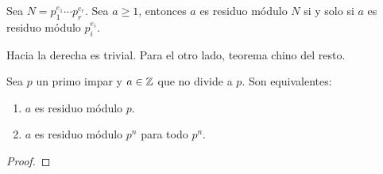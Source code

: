 \documentclass[CR.tex]{subfiles}
\begin{document}
\begin{prop}
Sea $N=p_1^{e_1}\cdots p_r^{e_r}$. Sea $a\geq 1$, entonces $a$ es residuo módulo $N$ si y solo si $a$ es residuo módulo $p_i^{e_i}$. 
\end{prop}
\begin{dem}
Hacia la derecha es trivial. Para el otro lado, teorema chino del resto.
\end{dem}

\begin{lemma}
Sea $p$ un primo impar y $a\in\mathbb{Z}$ que no divide a $p$. Son equivalentes:
\begin{enumerate}
\item $a$ es residuo módulo $p$.
\item $a$ es residuo módulo $p^n$ para todo $p^n$. 
\end{enumerate}
\end{lemma}
\begin{proof}

\end{proof}
\end{document}
